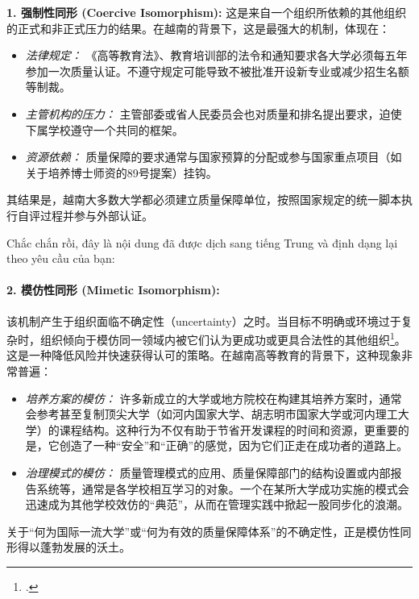 \textbf{1. 强制性同形 (Coercive Isomorphism):} 这是来自一个组织所依赖的其他组织的正式和非正式压力的结果。在越南的背景下，这是最强大的机制，体现在：
\begin{itemize}
    \item \textit{法律规定：} 《高等教育法》、教育培训部的法令和通知要求各大学必须每五年参加一次质量认证。不遵守规定可能导致不被批准开设新专业或减少招生名额等制裁。
    \item \textit{主管机构的压力：} 主管部委或省人民委员会也对质量和排名提出要求，迫使下属学校遵守一个共同的框架。
    \item \textit{资源依赖：} 质量保障的要求通常与国家预算的分配或参与国家重点项目（如关于培养博士师资的89号提案）挂钩。
\end{itemize}
其结果是，越南大多数大学都必须建立质量保障单位，按照国家规定的统一脚本执行自评过程并参与外部认证。




Chắc chắn rồi, đây là nội dung đã được dịch sang tiếng Trung và định dạng lại theo yêu cầu của bạn:


\paragraph{2. 模仿性同形 (Mimetic Isomorphism):}
该机制产生于组织面临不确定性（uncertainty）之时。当目标不明确或环境过于复杂时，组织倾向于模仿同一领域内被它们认为更成功或更具合法性的其他组织\footcite{DiMaggioPowell1983}。这是一种降低风险并快速获得认可的策略。在越南高等教育的背景下，这种现象非常普遍：
\begin{itemize}
    \item \textit{培养方案的模仿：} 许多新成立的大学或地方院校在构建其培养方案时，通常会参考甚至复制顶尖大学（如河内国家大学、胡志明市国家大学或河内理工大学）的课程结构。这种行为不仅有助于节省开发课程的时间和资源，更重要的是，它创造了一种“安全”和“正确”的感觉，因为它们正走在成功者的道路上。
    \item \textit{治理模式的模仿：} 质量管理模式的应用、质量保障部门的结构设置或内部报告系统等，通常是各学校相互学习的对象。一个在某所大学成功实施的模式会迅速成为其他学校效仿的“典范”，从而在管理实践中掀起一股同步化的浪潮。
\end{itemize}
关于“何为国际一流大学”或“何为有效的质量保障体系”的不确定性，正是模仿性同形得以蓬勃发展的沃土。

